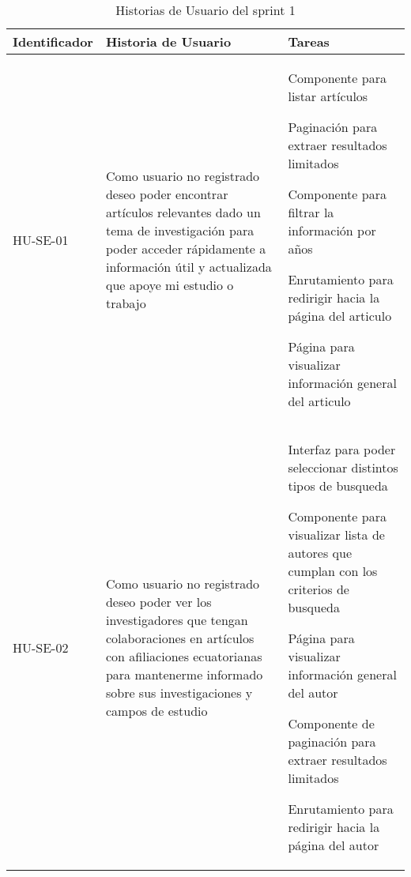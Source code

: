 \begin{table}[H]
    \centering
    \begin{tabular}{|p{2.5cm}|p{5cm}|p{6cm}|}
        \midrule
        \textbf{Identificador} & \textbf{Historia de Usuario}                                                                                                                                                                               & \textbf{Tareas} \\

        \hline
        HU-SE-01 & Como usuario no registrado deseo poder encontrar artículos relevantes dado un  tema de investigación para poder acceder rápidamente a información útil y actualizada que apoye mi estudio o trabajo        &
        \begin{compactitem}
            \item Componente para listar \break artículos
            \item Paginación para extraer resultados limitados
            \item Componente para filtrar la \break información por años
            \item Enrutamiento para redirigir hacia la página del articulo
            \item Página para visualizar \break información general del articulo
        \end{compactitem}
        \\
        \hline
        HU-SE-02 & Como usuario no registrado deseo poder ver los investigadores que tengan colaboraciones en artículos con afiliaciones ecuatorianas para mantenerme informado sobre sus investigaciones y campos de estudio &
        \begin{compactitem}
            \item Interfaz para poder seleccionar distintos tipos de busqueda
            \item Componente para visualizar lista de autores que cumplan con los criterios de busqueda
            \item Página para visualizar información general del autor
            \item Componente de paginación para extraer resultados limitados
            \item Enrutamiento para redirigir hacia la página del autor
        \end{compactitem}
        \\
        \hline
        
    \end{tabular}
    \caption{Historias de Usuario del sprint 1}
    \label{C2T1:Historias de Usuario del Sprint 1}
\end{table}